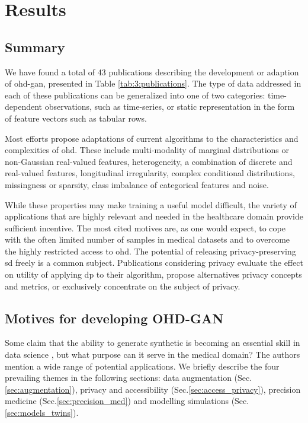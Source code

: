 \section{Results}
    \subsection{Summary}
        We have found a total of 43  publications describing the development or adaption of \gls{ohd-gan}, presented in Table \ref{tab:3:publications}. The type of data addressed in each of these publications can be generalized into one of two categories: time-dependent observations, such as time-series, or static representation in the form of feature vectors such as tabular rows.\par
        
        Most efforts propose adaptations of current algorithms to the characteristics and complexities of \gls{ohd}. These include multi-modality of marginal distributions or non-Gaussian real-valued features, heterogeneity, a combination of discrete and real-valued features, longitudinal irregularity, complex conditional distributions, missingness or sparsity, class imbalance of categorical features and noise.\par 
        
        While these properties may make training a useful model difficult, the variety of applications that are highly relevant and needed in the healthcare domain provide sufficient incentive. The most cited motives are, as one would expect, to cope with the often limited number of samples in medical datasets and to overcome the highly restricted access to \gls{ohd}. The potential of releasing privacy-preserving \gls{sd} freely is a common subject. Publications considering privacy evaluate the effect on utility of applying \gls{dp} to their algorithm, propose alternatives privacy concepts and metrics, or exclusively concentrate on the subject of privacy.\par
        
    \subsection{Motives for developing OHD-GAN}
        Some claim that the ability to generate synthetic is becoming an essential skill in data science \cite{Sarkar2018}, but what purpose can it serve in the medical domain? The authors mention a wide range of potential applications. We briefly describe the four prevailing themes in the following sections: data augmentation (Sec.\ref{sec:augmentation}), privacy and accessibility (Sec.\ref{sec:access_privacy}), precision medicine (Sec.\ref{sec:precision_med}) and  modelling simulations (Sec.\ref{sec:models_twins}). 

